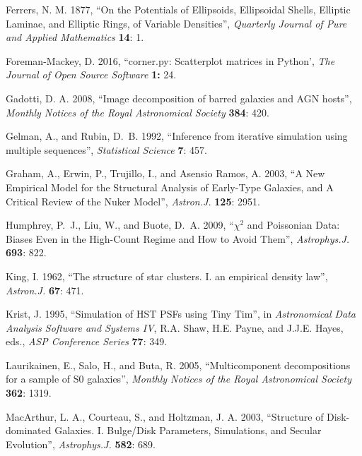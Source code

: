 \documentclass[10pt,a4paper,article]{memoir}
\begin{document}
\begin{thebibliography}{}
 Ferrers, N. M. 1877, ``On the
Potentials of Ellipsoids, Ellipsoidal Shells, Elliptic Laminae, and
Elliptic Rings, of Variable Densities'', \textit{Quarterly Journal
of Pure and Applied Mathematics} \textbf{14}: 1.

 Foreman-Mackey, D. 2016,
``corner.py: Scatterplot matrices in Python', \textit{The Journal of Open Source Software}
\textbf{1:} 24.

 Gadotti, D. A. 2008, ``Image
decomposition of barred galaxies and AGN hosts'', \textit{Monthly
Notices of the Royal Astronomical Society} \textbf{384}: 420.

 Gelman, A., and Rubin,
D.~B. 1992, ``Inference from iterative simulation using multiple
sequences'', \textit{Statistical Science} \textbf{7}: 457.

 Graham, A., Erwin, P., Trujillo, I., and
Asensio Ramos, A. 2003, ``A New Empirical Model for the Structural Analysis of
Early-Type Galaxies, and A Critical Review of the Nuker Model'',
\textit{Astron.J.} \textbf{125}: 2951.

 Humphrey, P.~J.,
Liu, W., and Buote, D.~A. 2009, ``{$\chi$}$^{2}$ and Poissonian Data:
Biases Even in the High-Count Regime and How to Avoid Them'',
\textit{Astrophys.J.} \textbf{693}: 822.

 King, I. 1962, ``The structure of star
clusters. I. an empirical density law'', \textit{Astron.J.} \textbf{67}:
471.

 Krist, J. 1995, ``Simulation of HST PSFs using
Tiny Tim'', in \textit{Astronomical Data Analysis Software and Systems IV}, R.A.
Shaw, H.E. Payne, and J.J.E. Hayes, eds., \textit{ASP Conference Series}
\textbf{77}: 349.

 Laurikainen,
E., Salo, H., and Buta, R. 2005, ``Multicomponent decompositions for a
sample of S0 galaxies'', \textit{Monthly Notices of the Royal
Astronomical Society} \textbf{362}: 1319.

 MacArthur, L. A.,
Courteau, S., and Holtzman, J. A. 2003, ``Structure of Disk-dominated Galaxies.
I. Bulge/Disk Parameters, Simulations, and Secular Evolution'',
\textit{Astrophys.J.} \textbf{582}: 689.


\end{thebibliography}
\end{document}

